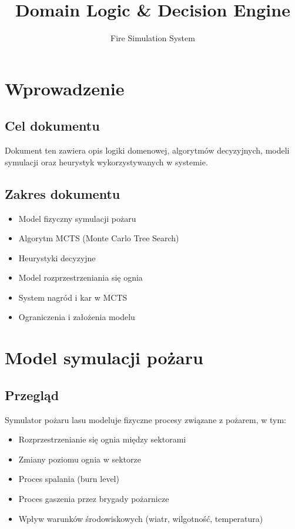 \documentclass[11pt,a4paper]{article}
\title{Domain Logic \& Decision Engine}
\author{Fire Simulation System}
\begin{document}
\maketitle
\newpage

\section{Wprowadzenie}

\subsection{Cel dokumentu}

Dokument ten zawiera opis logiki domenowej, algorytmów decyzyjnych, modeli symulacji oraz heurystyk wykorzystywanych w systemie.

\subsection{Zakres dokumentu}

\begin{itemize}
    \item Model fizyczny symulacji pożaru
    \item Algorytm MCTS (Monte Carlo Tree Search)
    \item Heurystyki decyzyjne
    \item Model rozprzestrzeniania się ognia
    \item System nagród i kar w MCTS
    \item Ograniczenia i założenia modelu
\end{itemize}

\section{Model symulacji pożaru}

\subsection{Przegląd}

Symulator pożaru lasu modeluje fizyczne procesy związane z pożarem, w tym:
\begin{itemize}
    \item Rozprzestrzenianie się ognia między sektorami
    \item Zmiany poziomu ognia w sektorze
    \item Proces spalania (burn level)
    \item Proces gaszenia przez brygady pożarnicze
    \item Wpływ warunków środowiskowych (wiatr, wilgotność, temperatura)
\end{itemize}
\end{document}

